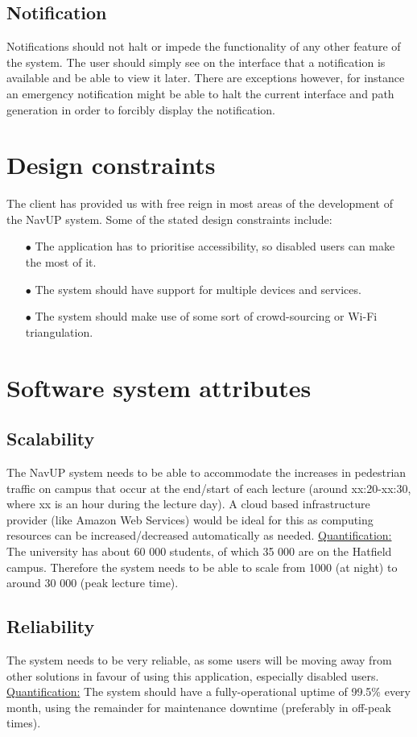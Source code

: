 \documentclass[english]{article}
\begin{document}
	\subsection{Notification}
Notifications should not halt or impede the functionality of any other feature of the system. The user should simply see on the interface that a notification is available and be able to view it later. There are exceptions however, for instance an emergency notification might be able to halt the current interface and path generation in order to forcibly display the notification. 
	\section{Design constraints}
	The client has provided us with free reign in most areas of the development of the NavUP system. Some of the stated design constraints include:
		\begin{itemize}
			\item[$\bullet$] The application has to prioritise accessibility, so disabled users can make the most of it.
			\item[$\bullet$] The system should have support for multiple devices and services.
			\item[$\bullet$] The system should make use of some sort of crowd-sourcing or Wi-Fi triangulation.
		\end{itemize}

	\section{Software system attributes}
	\subsection{Scalability}
	The NavUP system needs to be able to accommodate the increases in pedestrian traffic on campus that occur at the end/start of each lecture (around xx:20-xx:30, where xx is an hour during the lecture day). A cloud based infrastructure provider (like Amazon Web Services) would be ideal for this as computing resources can be increased/decreased automatically as needed.
	\newline
	\newline
	\underline{Quantification:} The university has about 60 000 students, of which 35 000 are on the Hatfield campus. Therefore the system needs to be able to scale from 1000 (at night) to around 30 000 (peak lecture time).
	\subsection{Reliability}
	The system needs to be very reliable, as some users will be moving away from other solutions in favour of using this application, especially disabled users.
	\newline
	\newline
	\underline{Quantification:} The system should have a fully-operational uptime of 99.5\% every month, using the remainder for maintenance downtime (preferably in off-peak times).
\end{document}

